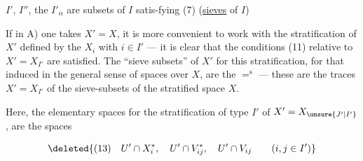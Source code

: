 $I'$, $I''$, the $I'_\alpha$ are subsets of $I$ satis-\linebreak fying (7) (\uline{sieves} of $I$)

If in A) one takes $X'=X$, it is more convenient to work with the stratification of $X'$ defined by the $X_i$ with $i\in I'$ --- it is clear that the conditions (11) relative to $X'=X_{I'}$ are satisfied. The ``sieve subsets'' of $X'$ for this stratification,  for that induced in the general sense of spaces over $X$, are the $=^{\mathrm s}$ --- these are  the  traces  $X'=X_{I'}$ of the sieve-subsets of the stratified space $X$.

Here, the elementary spaces for the stratification of type $I'$ of  $X'=X_{\unsure{J'|I'}}$, are the spaces

\[
\deleted{(13)\quad U'\cap X_i^*,\quad U'\cap V_{ij}^*,\quad U'\cap V_{ij}\qquad(i,j\in I')}
\]

